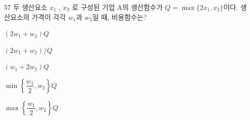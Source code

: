 \begin{question}{57}
두 생산요소 $x_{1}$ , $x_{2}$ 로 구성된 기업 A의 생산함수가 $Q=\max\{2x_{1},x_{2}\}$이다. 생산요소의 가격이 각각 $w_{1}$과 $w_{2}$일 때, 비용함수는?
\begin{choices}
  \item $(2w_{1}+w_{2})Q$
  \item $(2w_{1}+w_{2})/Q$
  \item $(w_{1}+2w_{2})Q$
  \item $\min\left\{\dfrac{w_{1}}{2},w_{2}\right\}Q$
  \item $\max\left\{\dfrac{w_{1}}{2},w_{2}\right\}Q$
\end{choices}
\end{question}
